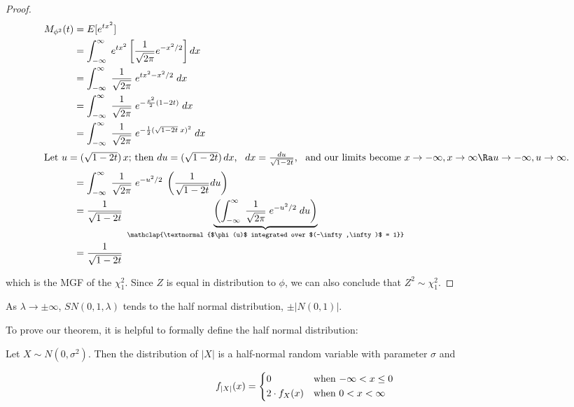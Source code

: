 \documentclass{article}
\begin{document}
\begin{proof}
  \begin{align*}
    M_{\phi^2}(t) &= E[e^{tx^2}] \\
    &= \int_{-\infty}^\infty \; e^{tx^2} \left[ \frac{1}{\sqrt{2\pi}} e^{-x^2/2} \right] dx \\
    &= \int_{-\infty}^\infty \; \frac{1}{\sqrt{2\pi}} \; e^{tx^2 - x^2/2} \; dx \\
    &= \int_{-\infty}^\infty \; \frac{1}{\sqrt{2\pi}} \; e^{-\frac{x^2}{2}(1 - 2t)} \; dx \\
    &= \int_{-\infty}^\infty \; \frac{1}{\sqrt{2\pi}} \; e^{-\frac{1}{2}(\sqrt{1-2t} \; x)^2} \; dx \\
    \intertext{Let $u = (\sqrt{1-2t}) \, x$; then $du = (\sqrt{1-2t}) \, dx$, \enspace $dx = \frac{du}{\sqrt{1-2t}}$, \enspace and our limits become $x \to -\infty, x \to \infty \Ra
      u \to -\infty, u \to \infty$.}
    &= \int_{-\infty}^\infty \; \frac{1}{\sqrt{2\pi}} \; e^{-u^2/2} \; \left( \frac{1}{\sqrt{1-2t}} du \right) \\
    &= \frac{1}{\sqrt{1-2t}} \; \underbrace{\left( \int_{-\infty}^\infty \; \frac{1}{\sqrt{2\pi}} \; e^{-u^2/2} \; du \right)}_{\mathclap{\textnormal{$\phi(u)$ integrated over
      $(-\infty,\infty)$ = 1}}} \label{phi-pdf} \\
    &= \frac{1}{\sqrt{1-2t}}
  \end{align*}

  which is the MGF of the $\chi^2_1$. Since $Z$ is equal in distribution to
  $\phi$, we can also conclude that $Z^2 \sim \chi^2_1$. \end{proof}

\begin{property} \label{prop:3}
  As $\lambda \to \pm \infty$, \thinspace $SN(0,1,\lambda)$ tends to the half normal distribution, $\pm |N(0,1)|$.
\end{property}

To prove our theorem, it is helpful to formally define the half normal distribution:

\begin{helper-lem} \label{lem:p2-half-normal}
  Let $X \sim N(0, \sigma^2)$. Then the distribution of $|X|$ is a half-normal
  random variable with parameter $\sigma$ and

  \begin{equation*}
    f_{|X|}(x) =
    \begin{dcases*}
      0              & when $-\infty < x \leq 0$ \\
      2 \cdot f_X(x) & when $0 < x < \infty$ 
    \end{dcases*}
  \end{equation*}
\end{helper-lem}
\end{document}
